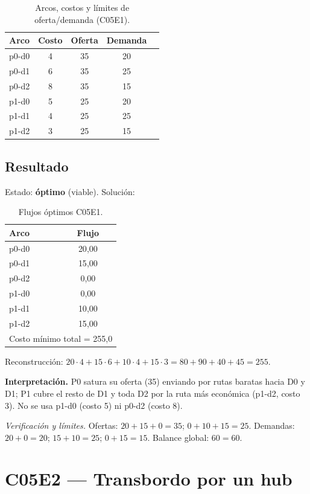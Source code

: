 \documentclass[11pt,a4paper]{article}
\newcommand{\interpretacion}[1]{\noindent\textbf{Interpretación.} #1\par}
\newcommand{\verif}[1]{\noindent\small\textit{Verificación y límites.} #1\par}
\begin{document}
\begin{table}[H]
\centering
\small
\caption{Arcos, costos y límites de oferta/demanda (C05E1).}
\label{tab:c05e1}
\begin{tabular}{@{}lcccc@{}}
\toprule
Arco & Costo & Oferta & Demanda \\
\midrule
p0-d0 & 4 & 35 & 20 \\
p0-d1 & 6 & 35 & 25 \\
p0-d2 & 8 & 35 & 15 \\
p1-d0 & 5 & 25 & 20 \\
p1-d1 & 4 & 25 & 25 \\
p1-d2 & 3 & 25 & 15 \\
\bottomrule
\end{tabular}
\end{table}

\subsection*{Resultado}
Estado: \textbf{óptimo} (viable). Solución:
\begin{table}[H]
\centering
\small
\caption{Flujos óptimos C05E1.}
\begin{tabular}{@{}lc@{}}
\toprule
Arco & Flujo \\
\midrule
p0-d0 & 20{,}00 \\
p0-d1 & 15{,}00 \\
p0-d2 & 0{,}00 \\
p1-d0 & 0{,}00 \\
p1-d1 & 10{,}00 \\
p1-d2 & 15{,}00 \\
\midrule
\multicolumn{2}{l}{Costo mínimo total = 255{,}0} \\
\bottomrule
\end{tabular}
\end{table}

Reconstrucción: $20{\cdot}4 + 15{\cdot}6 + 10{\cdot}4 + 15{\cdot}3 = 80 + 90 + 40 + 45 = 255$.

\interpretacion{P0 satura su oferta (35) enviando por rutas baratas hacia D0 y D1; P1 cubre el resto de D1 y toda D2 por la ruta más económica (p1-d2, costo 3). No se usa p1-d0 (costo 5) ni p0-d2 (costo 8).}

\verif{Ofertas: $20+15+0=35$; $0+10+15=25$. Demandas: $20+0=20$; $15+10=25$; $0+15=15$. Balance global: $60=60$.}

\section{C05E2 --- Transbordo por un hub}
\end{document}

